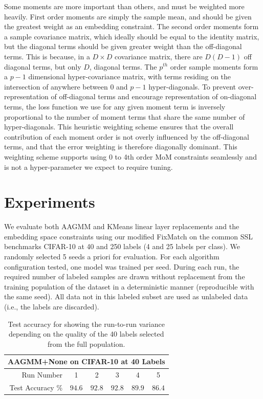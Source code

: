 \documentclass[10pt,twocolumn,letterpaper]{article}
\begin{document}
Some moments are more important than others, and must be weighted more heavily.  
First order moments are simply the sample mean, and should be given the greatest weight as an embedding constraint.  
The second order moments form a sample covariance matrix, which ideally should be equal to the identity matrix, but the diagonal terms should be given greater weight than the off-diagonal terms.  
This is because, in a $D \times D$ covariance matrix, there are $D(D-1)$ off diagonal terms, but only $D$, diagonal terms.  
The $p^{th}$ order sample moments form a $p-1$ dimensional hyper-covariance matrix, with terms residing on the intersection of anywhere between $0$ and $p-1$ hyper-diagonals.  
To prevent over-representation of off-diagonal terms and encourage representation of on-diagonal terms, the loss function we use for any given moment term is inversely proportional to the number of moment terms that share the same number of hyper-diagonals.  
This heuristic weighting scheme ensures that the overall contribution of each moment order is not overly influenced by the off-diagonal terms, and that the error weighting is therefore diagonally dominant.
This weighting scheme supports using 0 to 4th order MoM constraints seamlessly and is not a hyper-parameter we expect to require tuning.

\section{Experiments}



We evaluate both AAGMM and KMeans linear layer replacements and the embedding space constraints using our modified FixMatch \cite{sohn2020fixmatch} on the common SSL benchmarks CIFAR-10 \cite{cifar10} at 40 and 250 labels (4 and 25 labels per class). 
We randomly selected 5 seeds a priori for evaluation.
For each algorithm configuration tested, one model was trained per seed.
During each run, the required number of labeled samples are drawn without replacement from the training population of the dataset in a deterministic manner (reproducible with the same seed).
All data not in this labeled subset are used as unlabeled data (i.e., the labels are discarded).



\begin{table}[h!]
	\begin{tabular}{r|c|c|c|c|c}
		\multicolumn{6}{c}{AAGMM+None on CIFAR-10 at 40 Labels}\\
		\hline
		Run Number & 1 & 2 & 3 & 4 & 5 \\
		\hline
		Test Accuracy \% & $94.6$ & $92.8$ & $92.8$ & $89.9$ & $86.4$ \\
	\end{tabular}
	\caption{Test accuracy for showing the run-to-run variance depending on the quality of the 40 labels selected from the full population.}
	\label{tab:runvariability}
\end{table}
\end{document}
